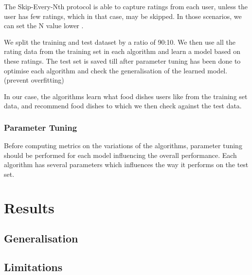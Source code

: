 The Skip-Every-Nth protocol is able to capture ratings from each user, unless the user has few ratings, which in that case, may be skipped. In those scenarios, we can set the N value lower . 



We split the training and test dataset by a ratio of 90:10. We then use all the rating data from the training set in each algorithm and learn a model based on these ratings. The test set is saved till after parameter tuning has been done to optimise each algorithm and check the generalisation of the learned model. (prevent overfitting)

In our case, the algorithms learn what food dishes users like from the training set data, and recommend food dishes to which we then check against the test data. 


\subsubsection{Parameter Tuning}

Before computing metrics on the variations of the algorithms, parameter tuning should be performed for each model influencing the overall performance. Each algorithm has several parameters which influences the way it performs on the test set. 


\section{Results}

\subsection{Generalisation}

\subsection{Limitations}



